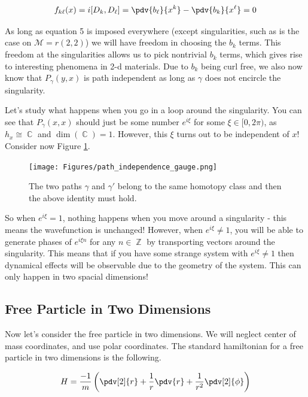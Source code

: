 \documentclass{article}
\DeclareMathOperator{\ZZ}{\mathbb{Z}}
\DeclareMathOperator{\CC}{\mathbb{C}}
\begin{document}
\begin{equation}
f_{k\ell}(x) = i[D_k,D_\ell] = \pdv{b_\ell}{x^k} - \pdv{b_k}{x^\ell}=0
\end{equation}

As long as equation 5 is imposed everywhere (except singularities, such as is the case on $\mathcal{M}=r(2,2)$) we will have freedom in choosing the $b_k$ terms. This freedom at the singularities allows us to pick nontrivial $b_k$ terms, which gives rise to interesting phenomena in 2-d materials. Due to $b_k$ being curl free, we also now know that $P_\gamma(y,x)$ is path independent as long as $\gamma$ does not encircle the singularity.

Let's study what happens when you go in a loop around the singularity. You can see that $P_\gamma(x,x)$ should just be some number $e^{i\xi}$ for some $\xi \in [0,2\pi)$, as $h_x \cong \CC$ and $\dim(\CC)=1$. However, this $\xi$ turns out to be independent of $x$! Consider now Figure \ref{fig:31}. 

\begin{figure}[ht]
    \centering
    \texttt{[image: Figures/path\_independence\_gauge.png]}
    \captionsetup{belowskip=-15pt}
    \caption{The two paths $ \gamma $ and $ \gamma' $ belong to the same homotopy class and then the above identity must hold.}
    \label{fig:31}
\end{figure}

So when $e^{i\xi}=1$, nothing happens when you move around a singularity - this means the wavefunction is unchanged! However, when $e^{i\xi}\neq 1$, you will be able to generate phases of $e^{i\xi n}$ for any $n \in \ZZ$ by transporting vectors around the singularity. This means that if you have some strange system with $e^{i\xi}\neq 1$ then dynamical effects will be observable due to the geometry of the system. This can only happen in two spacial dimensions!

\subsection{Free Particle in Two Dimensions}

Now let's consider the free particle in two dimensions. We will neglect center of mass coordinates, and use polar coordinates. The standard hamiltonian for a free particle in two dimensions is the following.

\begin{equation}
H = \frac{-1}{m}\left(\pdv[2]{r}+\frac{1}{r}\pdv{r}+ \frac{1}{r^2}\pdv[2]{\phi}\right)
\end{equation}
\end{document}
